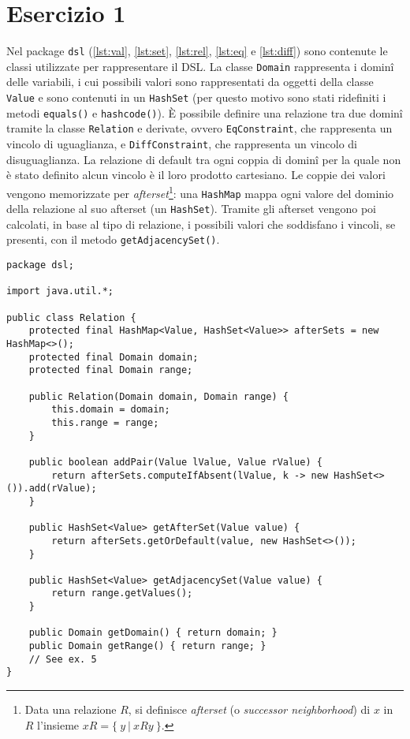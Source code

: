\section*{Esercizio 1}

Nel package {\tt dsl} (\autoref{lst:val}, \ref{lst:set}, \ref{lst:rel},
\ref{lst:eq} e \ref{lst:diff}) sono contenute le classi utilizzate per
rappresentare il DSL. La classe \texttt{Domain} rappresenta i dominî delle
variabili, i cui possibili valori sono rappresentati da oggetti della classe
\texttt{Value} e sono contenuti in un {\tt HashSet} (per questo motivo sono
stati ridefiniti i metodi {\tt equals()} e {\tt hashcode()}). È possibile
definire una relazione tra due dominî tramite la classe {\tt Relation} e
derivate, ovvero {\tt EqConstraint}, che rappresenta un vincolo di uguaglianza,
e {\tt DiffConstraint}, che rappresenta un vincolo di disuguaglianza. La
relazione di default tra ogni coppia di dominî per la quale non è stato definito
alcun vincolo è il loro prodotto cartesiano. Le coppie dei valori vengono
memorizzate per \emph{afterset}\footnote{Data una relazione $R$, si definisce
\emph{afterset} (o \emph{successor neighborhood}) di $x$ in $R$ l'insieme $xR = \{\
y\ |\ xRy\ \}$.}: una {\tt HashMap} mappa ogni valore del dominio della
relazione al suo afterset (un {\tt HashSet}). Tramite gli afterset vengono poi
calcolati, in base al tipo di relazione, i possibili valori che soddisfano i
vincoli, se presenti, con il metodo  {\tt getAdjacencySet()}.




\bgroup
{}
\begin{lstlisting}[caption=Relation.java, label=lst:rel]
package dsl;

import java.util.*;

public class Relation {
    protected final HashMap<Value, HashSet<Value>> afterSets = new HashMap<>();
    protected final Domain domain;
    protected final Domain range;

    public Relation(Domain domain, Domain range) {
        this.domain = domain;
        this.range = range;
    }

    public boolean addPair(Value lValue, Value rValue) {
        return afterSets.computeIfAbsent(lValue, k -> new HashSet<>()).add(rValue);
    }

    public HashSet<Value> getAfterSet(Value value) {
        return afterSets.getOrDefault(value, new HashSet<>());
    }

    public HashSet<Value> getAdjacencySet(Value value) {
        return range.getValues();
    }

    public Domain getDomain() { return domain; }
    public Domain getRange() { return range; }
    // See ex. 5
}
\end{lstlisting}
\egroup

